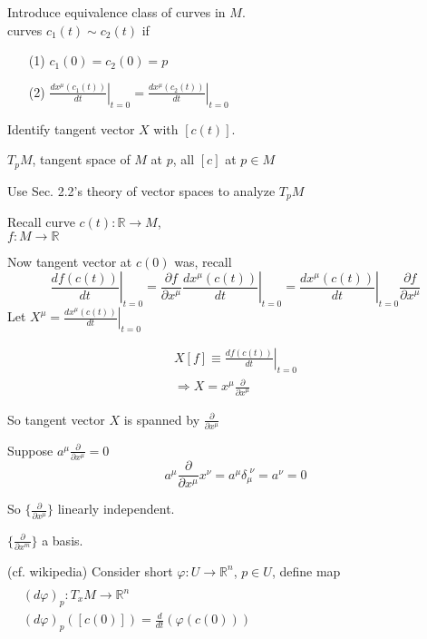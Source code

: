 \documentclass{book}
\begin{document}
Introduce equivalence class of curves in $M$.  \\
curves $c_1(t) \sim c_2(t)$ if 
\begin{enumerate}
\item[(1)] $c_1(0) = c_2(0) = p$ 
\item[(2)] $
\left. \frac{dx^{\mu}{ (c_1(t)) } }{ dt} \right|_{t=0} = \left. \frac{dx^{\mu}(c_2(t)) }{ dt} \right|_{t=0}
$
\end{enumerate}

Identify tangent vector $X$ with $[c(t)]$.  

$T_p M$, tangent space of $M$ at $p$, all $[c]$ at $p \in M$ 

Use Sec. 2.2's theory of vector spaces to analyze $T_pM$ 

\hrulefill

Recall curve $c(t) : \mathbb{R} \to M$,  \\
\phantom{Recall curve }  $f: M \to \mathbb{R}$

Now tangent vector at $c(0)$ was, recall
\[
\left. \frac{df(c(t))}{ dt} \right|_{t=0} = \frac{ \partial f}{ \partial x^{\mu}}  \left. \frac{ dx^{\mu}(c(t))}{ dt} \right|_{t=0} = \left. \frac{dx^{\mu}(c(t))}{ dt} \right|_{t=0} \frac{ \partial f}{ \partial x^{\mu} }
\]
Let $X^{\mu} = \left. \frac{dx^{\mu}(c(t))}{ dt} \right|_{t=0}$

\[
\begin{gathered}
X[f] \equiv \left. \frac{df(c(t))}{ dt} \right|_{t=0} \\
\Longrightarrow X = x^{\mu} \frac{ \partial}{ \partial x^{\mu}} \end{gathered}
\]

So tangent vector $X$ is spanned by $\frac{ \partial }{ \partial x^{\mu} }$

Suppose $a^{\mu} \frac{ \partial }{ \partial x^{\mu} } =0$ 
\[
a^{\mu} \frac{ \partial }{ \partial x^{\mu}} x^{\nu} = a^{\mu} \delta_{\mu}^{ \, \, \nu } = a^{\nu} = 0 
\]


So $\lbrace \frac{ \partial }{ \partial x^{\mu}} \rbrace$ linearly independent.  

$\lbrace \frac{ \partial }{ \partial x^{m}} \rbrace$ a basis.  

\hrulefill

(cf. wikipedia) Consider short $\varphi : U \to \mathbb{R}^n$, $p\in U$, define map  $ \begin{aligned} & \quad \\ 
  & ( d\varphi)_p : T_x M \to \mathbb{R}^n \\ 
  & (d\varphi)_p( [c(0 ) ]) = \frac{d}{dt} ( \varphi ( c(0 )) ) \end{aligned}$ 
\end{document}
